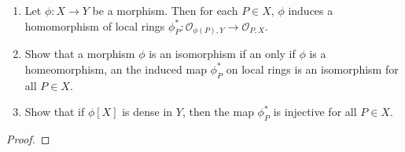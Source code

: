 \label{1.3.3}

\begin{enumerate}[label = (\alph*)]
    \item Let $\phi: X \longrightarrow Y$ be a morphism. Then for each $P \in X$, $\phi$ induces a homomorphism of local rings $\phi_P^*: \mathcal O_{\phi(P), Y} \longrightarrow \mathcal O_{P, X}$.
    
    \item Show that a morphism $\phi$ is an isomorphism if an only if $\phi$ is a homeomorphism, an the induced map $\phi_P^*$ on local rings is an isomorphism for all $P \in X$.

    \item Show that if $\phi[X]$ is dense in $Y$, then the map $\phi_P^*$ is injective for all $P \in X$.
\end{enumerate}

\begin{proof}

\end{proof}
